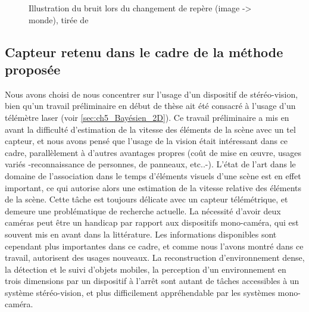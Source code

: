 \begin{figure}
	\caption{Illustration du bruit lors du changement de repère (image -> monde), tirée de \cite{Lenz2011}}
	\label{fig:bruit_disparité}
\end{figure}

\subsection{Capteur retenu dans le cadre de la méthode proposée} \label{sec:ch2_capteur_retenu}
Nous avons choisi de nous concentrer sur l'usage d'un dispositif de stéréo-vision, bien qu'un travail préliminaire en début de thèse ait été consacré à l'usage d'un télémètre laser (voir \ref{sec:ch5_Bayésien_2D}). Ce travail préliminaire a mis en avant la difficulté d'estimation de la vitesse des éléments de la scène avec un tel capteur, et nous avons pensé que l'usage de la vision était intéressant dans ce cadre, parallèlement à d'autres avantages propres (coût de mise en œuvre, usages variés -reconnaissance de personnes, de panneaux, etc..-). L'état de l'art dans le domaine de l'association dans le temps d'éléments visuels d'une scène est en effet important, ce qui autorise alors une estimation de la vitesse relative des éléments de la scène. Cette tâche est toujours délicate avec un capteur télémétrique, et demeure une problématique de recherche actuelle.
La nécessité d'avoir deux caméras peut être un handicap par rapport aux dispositifs mono-caméra, qui est souvent mis en avant dans la littérature. Les informations disponibles sont cependant plus importantes dans ce cadre, et comme nous l'avons montré dans ce travail, autorisent des usages nouveaux. La reconstruction d'environnement dense, la détection et le suivi d'objets mobiles, la perception d'un environnement en trois dimensions par un dispositif à l'arrêt sont autant de tâches accessibles à un système stéréo-vision, et plus difficilement appréhendable par les systèmes mono-caméra. 

